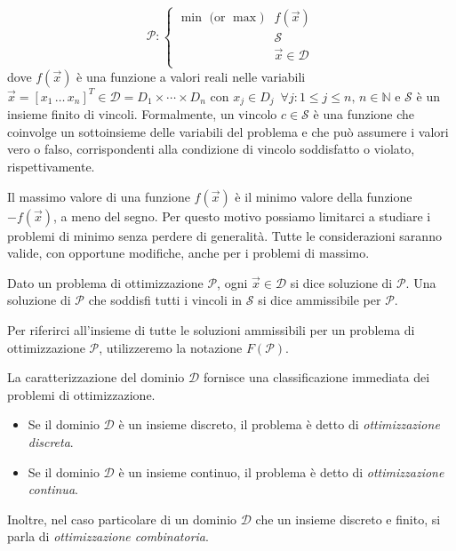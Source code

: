 \begin{equation}
    \mathcal{P}\colon
    \begin{cases}
        \text{$\min$ (or $\max$)} & f(\vec{x}) \\
                                  & \mathcal{S} \\
                                  & \vec{x} \in \mathcal{D} \\
    \end{cases}
\end{equation}
dove $f(\vec{x})$ è una funzione a valori reali nelle variabili $\vec{x} =
[x_{1}\, \ldots \, x_{n}]^T \in \mathcal{D} = D_{1} \times
\cdots \times D_{n}$ con $x_{j} \in D_{j}\,\,\,\forall j\colon 1 \le j
\le n,\, n \in \mathbb{N}$ e $\mathcal{S}$ è un insieme finito di vincoli.
Formalmente, un vincolo $c \in \mathcal{S}$ è una funzione che coinvolge un
sottoinsieme delle variabili del problema e che può assumere i valori vero
o falso, corrispondenti alla condizione di vincolo soddisfatto o violato,
rispettivamente.

Il massimo valore di una funzione $f(\vec{x})$ è il minimo valore della
funzione $-f(\vec{x})$, a meno del segno. Per questo motivo possiamo
limitarci a studiare i problemi di minimo senza perdere di generalità.
Tutte le considerazioni saranno valide, con opportune modifiche, anche per
i problemi di massimo.

\begin{definition}
Dato un problema di ottimizzazione $\mathcal{P}$, ogni $\vec{x} \in
\mathcal{D}$ si dice soluzione di $\mathcal{P}$. Una soluzione di
$\mathcal{P}$ che soddisfi tutti i vincoli in $\mathcal{S}$ si dice
ammissibile per $\mathcal{P}$.
\end{definition}
Per riferirci all'insieme di tutte le soluzioni ammissibili per un problema
di ottimizzazione $\mathcal{P}$, utilizzeremo la notazione
$F(\mathcal{P})$.

La caratterizzazione del dominio $\mathcal{D}$ fornisce una
classificazione immediata dei problemi di ottimizzazione.

\begin{itemize}
    \item Se il dominio $\mathcal{D}$ è un insieme discreto, il problema è
        detto di \textit{ottimizzazione discreta}.
    \item Se il dominio $\mathcal{D}$ è un insieme continuo, il problema è
        detto di \textit{ottimizzazione continua}.
\end{itemize}
Inoltre, nel caso particolare di un dominio $\mathcal{D}$ che un insieme
discreto e finito, si parla di \textit{ottimizzazione combinatoria}.

